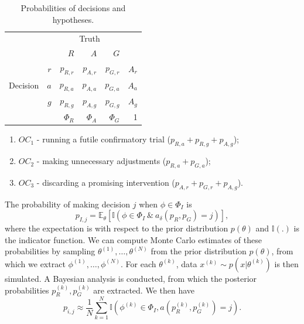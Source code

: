 \documentclass{article} %
\begin{document}
\begin{table}
\centering
\begin{tabular}{r r r r r r}
\toprule
& & \multicolumn{3}{c}{Truth} & \\
& & $R$ & $A$ & $G$ & \\
\midrule
\multirow{3}{*}{Decision} & $r$ & $p_{R,r}$ & $p_{A,r}$ & $p_{G,r}$ & $A_{r}$ \\
 & $a$ & $p_{R,a}$ & $p_{A,a}$ & $p_{G,a}$ & $A_{a}$ \\
 & $g$ & $p_{R,g}$ & $p_{A,g}$ & $p_{G,g}$ & $A_{g}$ \\
 \midrule
 & & $\Phi_{R}$ & $\Phi_{A}$ & $\Phi_{G}$ & 1 \\
\bottomrule
\end{tabular}
\caption{Probabilities of decisions and hypotheses.}
\label{tab:probs}
\end{table}

\begin{enumerate}
\item $OC_{1}$ - running a futile confirmatory trial ($p_{R,a} + p_{R,g} + p_{A,g}$);
\item $OC_{2}$ - making unnecessary adjustments ($p_{R,a} + p_{G,a}$);
\item $OC_{3}$ - discarding a promising intervention ($p_{A,r} + p_{G,r} + p_{A,g}$).
\end{enumerate}
The probability of making decision $j$ when $\phi \in \Phi_{I}$ is
\begin{equation}
p_{I,j} = \mathbb{E}_{\theta} [ \mathbb{I}(\phi \in \Phi_{I} ~\&~ a_{\delta}(p_{R}, p_{G}) = j) ],
\end{equation}
where the expectation is with respect to the prior distribution $p(\theta)$ and $\mathbb{I}(.)$ is the indicator function. We can compute Monte Carlo estimates of these probabilities by sampling $\theta^{(1)}, \ldots , \theta^{(N)}$ from the prior distribution $p(\theta)$, from which we extract $\phi^{(1)}, \ldots , \phi^{(N)}$. For each $\theta^{(k)}$, data $x^{(k)} \sim p(x | \theta^{(k)})$ is then simulated. A Bayesian analysis is conducted, from which the posterior probabilities $p_{R}^{(k)}, p_{G}^{(k)}$ are extracted. We then have
\begin{equation} \label{eqn:MC_prob}
p_{i,j} \approx \frac{1}{N} \sum_{k=1}^{N} \mathbb{I}(\phi^{(k)} \in \Phi_{I}, a(p_{R}^{(k)}, p_{G}^{(k)}) = j).
\end{equation}
\end{document}
